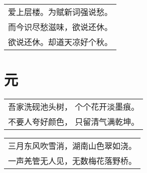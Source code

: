 \nopagebreak%
\nopagebreak%
\noindent\begin{minipage}{\linewidth}
  \vskip-3pt\begin{table}[H]
    \centering
    \begin{tabular}{@{}l@{}}
爱上层楼。为赋新词强说愁。\\
而今识尽愁滋味，欲说还休。\\
欲说还休。却道天凉好个秋。
    \end{tabular}
  \end{table}
\end{minipage}
\vspace{1cm}


\chapter{元}
\nopagebreak%
\nopagebreak%
\noindent\begin{minipage}{\linewidth}
  \vskip-3pt\begin{table}[H]
    \centering
    \begin{tabular}{@{}l@{}}
吾家洗砚池头树， 个个花开淡墨痕。\\
不要人夸好颜色， 只留清气满乾坤。
    \end{tabular}
  \end{table}
\end{minipage}
\vspace{1cm}


\nopagebreak%
\nopagebreak%
\noindent\begin{minipage}{\linewidth}
  \vskip-3pt\begin{table}[H]
    \centering
    \begin{tabular}{@{}l@{}}
三月东风吹雪消，湖南山色翠如浇。\\
一声羌管无人见，无数梅花落野桥。
    \end{tabular}
  \end{table}
\end{minipage}
\vspace{1cm}


